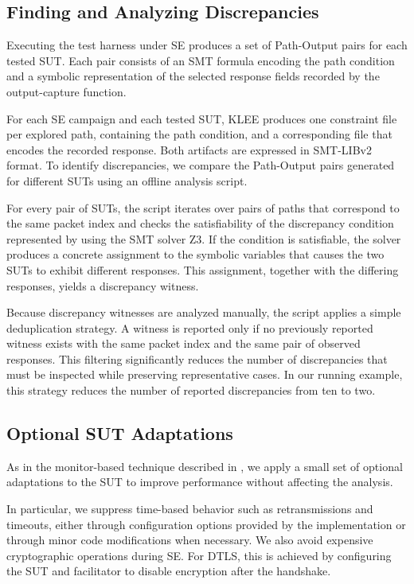\subsection{Finding and Analyzing Discrepancies}
Executing the test harness under SE produces a set of Path-Output pairs for each tested SUT.
Each pair consists of an SMT formula encoding the path condition and a symbolic representation of the selected response fields recorded by the output-capture function.

For each SE campaign and each tested SUT, KLEE produces one constraint file per explored path, containing the path condition, and a corresponding file that encodes the recorded response.
Both artifacts are expressed in SMT-LIBv2 format.
To identify discrepancies, we compare the Path-Output pairs generated for different SUTs using an offline analysis script.

For every pair of SUTs, the script iterates over pairs of paths that correspond to the same packet index and checks the satisfiability of the discrepancy condition represented by  using the SMT solver Z3.
If the condition is satisfiable, the solver produces a concrete assignment to the symbolic variables that causes the two SUTs to exhibit different responses.
This assignment, together with the differing responses, yields a discrepancy witness.

Because discrepancy witnesses are analyzed manually, the script applies a simple deduplication strategy.
A witness is reported only if no previously reported witness exists with the same packet index and the same pair of observed responses.
This filtering significantly reduces the number of discrepancies that must be inspected while preserving representative cases.
In our running example, this strategy reduces the number of reported discrepancies from ten to two.

\subsection{Optional SUT Adaptations}
As in the monitor-based technique described in , we apply a small set of optional adaptations to the SUT to improve performance without affecting the analysis.

In particular, we suppress time-based behavior such as retransmissions and timeouts, either through configuration options provided by the implementation or through minor code modifications when necessary.
We also avoid expensive cryptographic operations during SE.
For DTLS, this is achieved by configuring the SUT and facilitator to disable encryption after the handshake.


